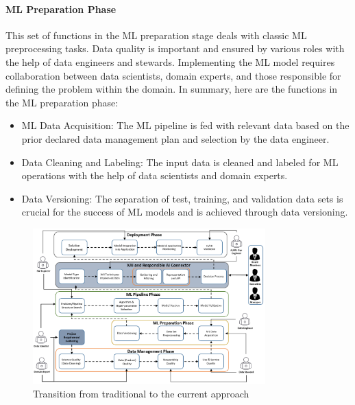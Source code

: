 \documentclass[conference]{IEEEtran}
\begin{document}
\paragraph{ML Preparation Phase} This set of functions in the ML preparation stage deals with classic ML preprocessing tasks. Data quality is important and ensured by various roles with the help of data engineers and stewards. Implementing the ML model requires collaboration between data scientists, domain experts, and those responsible for defining the problem within the domain. In summary, here are the functions in the ML preparation phase:
\begin{itemize}
	\item ML Data Acquisition: The ML pipeline is fed with relevant data based on the prior declared data management plan and selection by the data engineer.
	\item Data Cleaning and Labeling: The input data is cleaned and labeled for ML operations with the help of data scientists and domain experts.
	\item Data Versioning: The separation of test, training, and validation data sets is crucial for the success of ML models and is achieved through data versioning.
\end{itemize}

\begin{figure}[h!]
	\centering
	\includegraphics[width=0.8\textwidth]{ML-OPS_with_XAI.png}
	\caption{Transition from traditional to the current approach}
	\label{ReMixMatch}
\end{figure}
\end{document}
